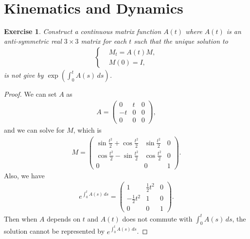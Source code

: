 \documentclass[11pt]{book}
\newtheorem{exercise}{Exercise}[section]
\theoremstyle{definition}
\numberwithin{equation}{chapter}
\begin{document}
\medskip

\section{Kinematics and Dynamics}

\begin{exercise}
Construct a continuous matrix function $A(t)$ where $A(t)$ is an anti-symmetric real $3\times 3$ matrix for each $t$ such that the unique solution to
\begin{align*}
    \left\{ 
    \begin{aligned}
        & M_t = A(t)M,\\
        & M(0) = I,
    \end{aligned}
    \right.
\end{align*}
is not give by $\exp\left(\int^t_0 A(s)\, ds \right)$.
\end{exercise}
\begin{proof}
We can set $A$ as 
\begin{align*}
    A = \begin{pmatrix}
        0 & t & 0 \\
        -t & 0 & 0 \\
        0 & 0 & 0 
    \end{pmatrix},
\end{align*}
and we can solve for $M$, which is
\begin{align*}
    M = \begin{pmatrix}
        \sin \frac{t^2}{2} + \cos \frac{t^2}{2} &  \sin \frac{t^2}{2} & 0 \\
        \cos \frac{t^2}{2} - \sin \frac{t^2}{2} &  \cos \frac{t^2}{2} & 0 \\
        0 & 0 & 1 
    \end{pmatrix}.
\end{align*}
Also, we have 
\begin{align*}
    e^{\int^t_0 A(s)\, ds} = \begin{pmatrix}
        1 & \frac{1}{2} t^2 & 0 \\
        -\frac{1}{2} t^2 & 1 & 0 \\
        0 & 0 & 1 
    \end{pmatrix}.
\end{align*}
Then when $A$ depends on $t$ and $A(t)$ does not commute with $\int^t_0 A(s)\, ds$, the solution cannot be represented by $e^{\int^t_0 A(s)\, ds}$.
\end{proof}

\medskip
\end{document}
